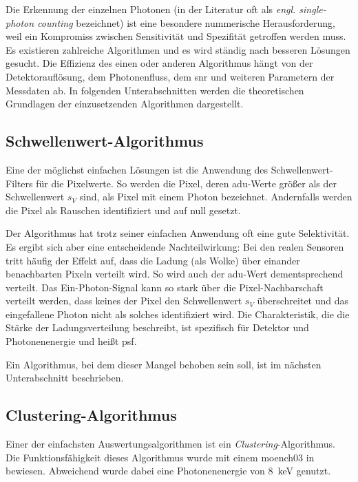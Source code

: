 \noindent
Die Erkennung der einzelnen Photonen (in der Literatur oft als \emph{engl. single-photon counting} bezeichnet) ist eine besondere nummerische Herausforderung, weil ein Kompromiss zwischen Sensitivität und Spezifität getroffen werden muss. Es existieren zahlreiche Algorithmen und es wird ständig nach besseren Lösungen gesucht. Die Effizienz des einen oder anderen Algorithmus hängt von der Detektorauflösung, dem Photonenfluss, dem \gls{snr} und weiteren Parametern der Messdaten ab. In folgenden Unterabschnitten werden die theoretischen Grundlagen der einzusetzenden Algorithmen dargestellt.

\subsection{Schwellenwert-Algorithmus}
\label{text:threshold_algorithm}
Eine der möglichst einfachen Lösungen ist die Anwendung des Schwellenwert-Filters für die Pixelwerte. So werden die Pixel, deren \gls{adu}-Werte größer als der Schwellenwert $s_V$ sind, als Pixel mit einem Photon bezeichnet. Andernfalls werden die Pixel als Rauschen identifiziert und auf null gesetzt.

\noindent
Der Algorithmus hat trotz seiner einfachen Anwendung oft eine gute Selektivität. Es ergibt sich aber eine entscheidende Nachteilwirkung: Bei den realen Sensoren tritt häufig der Effekt auf, dass die Ladung (als Wolke) über einander benachbarten Pixeln verteilt wird. So wird auch der \gls{adu}-Wert dementsprechend verteilt. Das Ein-Photon-Signal kann so stark über die Pixel-Nachbarschaft verteilt werden, dass keines der Pixel den Schwellenwert $s_V$ überschreitet und das eingefallene Photon nicht als solches identifiziert wird. Die Charakteristik, die die Stärke der Ladungsverteilung beschreibt, ist spezifisch für Detektor und Photonenenergie und heißt \gls{psf}.

\noindent
Ein Algorithmus, bei dem dieser Mangel behoben sein soll, ist im nächsten Unterabschnitt beschrieben.

\subsection{Clustering-Algorithmus}
\label{text:clustering_algorithm}
Einer der einfachsten Auswertungsalgorithmen ist ein \emph{Clustering}-Algorithmus. Die Funktionsfähigkeit dieses Algorithmus wurde mit einem \gls{moench03} in \cite{cartier_micron_2014} bewiesen. Abweichend wurde dabei eine Photonenenergie von \SI{8}{\kilo\eV} genutzt. 

